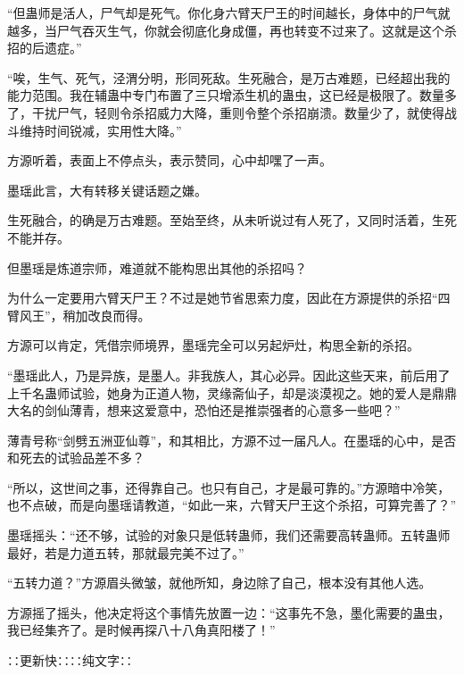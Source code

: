 \begin{this_body}
“但蛊师是活人，尸气却是死气。你化身六臂天尸王的时间越长，身体中的尸气就越多，当尸气吞灭生气，你就会彻底化身成僵，再也转变不过来了。这就是这个杀招的后遗症。”

“唉，生气、死气，泾渭分明，形同死敌。生死融合，是万古难题，已经超出我的能力范围。我在辅蛊中专门布置了三只增添生机的蛊虫，这已经是极限了。数量多了，干扰尸气，轻则令杀招威力大降，重则令整个杀招崩溃。数量少了，就使得战斗维持时间锐减，实用性大降。”

方源听着，表面上不停点头，表示赞同，心中却嘿了一声。

墨瑶此言，大有转移关键话题之嫌。

生死融合，的确是万古难题。至始至终，从未听说过有人死了，又同时活着，生死不能并存。

但墨瑶是炼道宗师，难道就不能构思出其他的杀招吗？

为什么一定要用六臂天尸王？不过是她节省思索力度，因此在方源提供的杀招“四臂风王”，稍加改良而得。

方源可以肯定，凭借宗师境界，墨瑶完全可以另起炉灶，构思全新的杀招。

“墨瑶此人，乃是异族，是墨人。非我族人，其心必异。因此这些天来，前后用了上千名蛊师试验，她身为正道人物，灵缘斋仙子，却是淡漠视之。她的爱人是鼎鼎大名的剑仙薄青，想来这爱意中，恐怕还是推崇强者的心意多一些吧？”

薄青号称“剑劈五洲亚仙尊”，和其相比，方源不过一届凡人。在墨瑶的心中，是否和死去的试验品差不多？

“所以，这世间之事，还得靠自己。也只有自己，才是最可靠的。”方源暗中冷笑，也不点破，而是向墨瑶请教道，“如此一来，六臂天尸王这个杀招，可算完善了？”

墨瑶摇头：“还不够，试验的对象只是低转蛊师，我们还需要高转蛊师。五转蛊师最好，若是力道五转，那就最完美不过了。”

“五转力道？”方源眉头微皱，就他所知，身边除了自己，根本没有其他人选。

方源摇了摇头，他决定将这个事情先放置一边：“这事先不急，墨化需要的蛊虫，我已经集齐了。是时候再探八十八角真阳楼了！”

∷更新快∷∷纯文字∷

\end{this_body}

